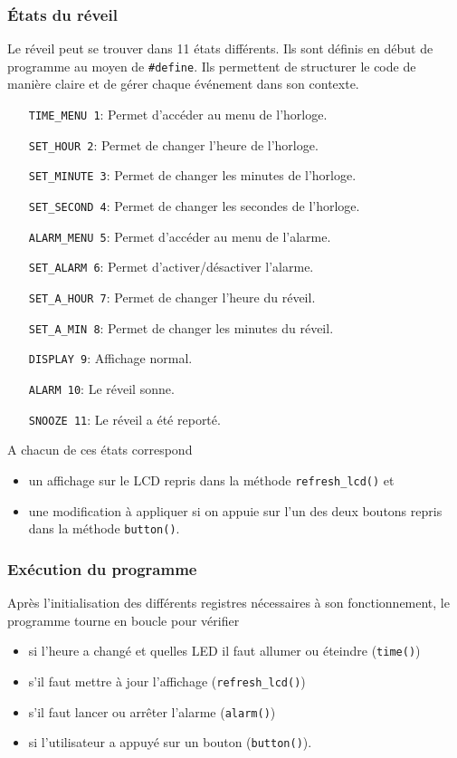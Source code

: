 \documentclass[12pt,a4paper]{article}
\begin{document}
    \subsubsection{\'Etats du réveil}
    Le réveil peut se trouver dans 11 états différents. Ils sont définis en début de programme au moyen de \texttt{\#define}. Ils permettent de structurer le code de manière claire et de gérer chaque événement dans son contexte.
    \begin{itemize}
    \item[\texttt{TIME\_MENU 1}:] Permet d'accéder au menu de l'horloge.
	\item[\texttt{SET\_HOUR 2}:] Permet de changer l'heure de l'horloge.
	\item[\texttt{SET\_MINUTE 3}:] Permet de changer les minutes de l'horloge.
	\item[\texttt{SET\_SECOND 4}:] Permet de changer les secondes de l'horloge.
	\item[\texttt{ALARM\_MENU 5}:] Permet d'accéder au menu de l'alarme.
	\item[\texttt{SET\_ALARM 6}:] Permet d'activer/désactiver l'alarme.
	\item[\texttt{SET\_A\_HOUR 7}:] Permet de changer l'heure du réveil.
	\item[\texttt{SET\_A\_MIN 8}:] Permet de changer les minutes du réveil.
	\item[\texttt{DISPLAY 9}:] Affichage normal.
	\item[\texttt{ALARM 10}:] Le réveil sonne.
	\item[\texttt{SNOOZE 11}:] Le réveil a été reporté.\\
    \end{itemize}
    
    A chacun de ces états correspond 
    \begin{itemize}
    \item un affichage sur le LCD repris dans la méthode \texttt{refresh\_lcd()} et
    \item une modification à appliquer si on appuie sur l'un des deux boutons repris dans la méthode \texttt{button()}.
    \end{itemize}
    
    
    \subsubsection{Exécution du programme}
    Après l'initialisation des différents registres nécessaires à son fonctionnement, le programme tourne en boucle pour vérifier
    \begin{itemize}
    \item si l'heure a changé et quelles LED il faut allumer ou éteindre (\texttt{time()})
    \item s'il faut mettre à jour l'affichage (\texttt{refresh\_lcd()})
    \item s'il faut lancer ou arrêter l'alarme (\texttt{alarm()})
    \item si l'utilisateur a appuyé sur un bouton (\texttt{button()}).
    \end{itemize}
    
\end{document}
